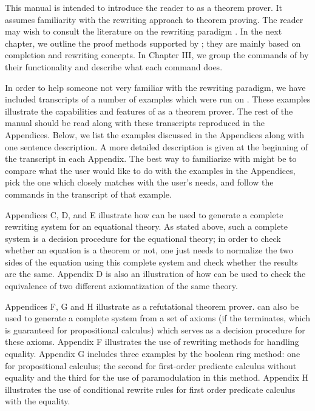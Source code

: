 This manual is intended to introduce the reader to \RRL as a theorem
prover. It assumes familiarity with the rewriting approach to theorem
proving.  The reader may wish to consult the literature on the
rewriting paradigm \cite{Huet80,Bundy,RTA85,JSC}.  In the next
chapter, we outline the proof methods supported by \ERRL; they are
mainly based on completion and rewriting concepts.  In Chapter III, we
group the commands of \RRL by their functionality and describe what
each command does.

In order to help someone not very familiar with the rewriting
paradigm, we have included transcripts of a number of examples which
were run on \ERRL. These examples illustrate the capabilities and
features of \RRL as a theorem prover.  The rest of the manual should be
read along with these transcripts reproduced in the Appendices. Below,
we list the examples discussed in the Appendices along with one
sentence description.  A more detailed description is given at the
beginning of the transcript in each Appendix.  The best way to
familiarize with \RRL might be to compare what the user would like to
do with the examples in the Appendices, pick the one which closely
matches with the user's needs, and follow the commands in the
transcript of that example.

Appendices C, D, and E illustrate how \RRL can be used to generate a
complete rewriting system for an equational theory.  
As stated above, such a complete
system is a decision procedure for the equational theory; in order to
check whether an equation is a theorem or not, one just needs to
normalize the two sides of the equation using this complete system and
check whether the results are the same. Appendix D is also an
illustration of how \RRL can be used to check the equivalence of two
different axiomatization of the same theory.

Appendices F, G and H illustrate \RRL as a refutational theorem
prover. \RRL can also be used to generate a complete system from a set
of axioms (if the \RRL terminates, which is guaranteed for
propositional calculus) which serves as a decision procedure for these
axioms. 
Appendix F illustrates the use of rewriting methods
for handling equality. 
Appendix G includes three examples by the boolean ring method:
one for propositional calculus; the second for
first-order predicate calculus
without equality and the third for the use
 of paramodulation
in this method.
Appendix H illustrates the
use of conditional rewrite rules for first order predicate
calculus with the equality.

